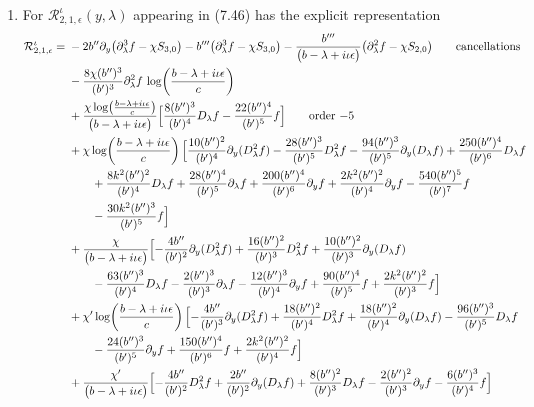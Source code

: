 \documentclass[reqno,11pt]{amsart}
\numberwithin{equation}{section}
\newcommand{\p}{\partial}
\newcommand{\D}{D_\lambda}
\numberwithin{equation}{section} %
\begin{document}
\begin{enumerate}
\item For $\mathcal{R}^\iota_{2,1,\epsilon}(y,\lambda)$ appearing in (7.46) has the explicit representation
\setlength{\jot}{3pt}
\begin{align}
\mathcal{R}^\iota_{2,1,\epsilon}={}&-2b'' \p_y\bigl(\p_\lambda^3f-\chi S_{3,0}\bigr)-b''' \bigl(\p_\lambda^3f-\chi S_{3,0}\bigr)-\frac{b''' }{\bigl(b -\lambda+i\iota\epsilon\bigr)}\bigl(\p_\lambda^2f-\chi S_{2,0}\bigr)\tag*{\text{cancellations}}\\
&-\frac{8\chi (b'' )^{3}}{(b' )^{3}}\p_\lambda^2f\,\log\!\left(\frac{b -\lambda+i\iota\epsilon}{c}\right)\notag\\
&+\frac{\chi\log\!\left(\frac{b -\lambda+i\iota\epsilon}{c}\right)}{\bigl(b -\lambda+i\iota\epsilon\bigr)}\Bigl[\frac{8 (b'' )^{3}}{(b' )^{4}} \D f- \frac{22 (b'' )^{4}}{(b' )^{5}} f\Bigr]\tag*{\text{order $-5$}}\\
&+\chi\log\!\left(\frac{b -\lambda+i\iota\epsilon}{c}\right)\Bigl[\frac{10 (b'' )^{2}}{(b' )^{4}} \p_y(\D^2 f)- \frac{28 (b'' )^{3}}{(b' )^{5}} \D^2 f- \frac{94 (b'' )^{3}}{(b' )^{5}} \p_y(\D f)+\frac{250 (b'' )^{4}}{(b' )^{6}} \D f\notag\\
&\qquad +\frac{8 k^2 (b'' )^{2}}{(b' )^{4}} \D f+\frac{28 (b'' )^{4}}{(b' )^{5}} \p_\lambda f+\frac{200 (b'' )^{4}}{(b' )^{6}} \p_y f+\frac{2 k^2 (b'' )^{2}}{(b' )^{4}} \p_y f- \frac{540 (b'' )^{5}}{(b' )^{7}} f\notag\\
&\qquad - \frac{30 k^2 (b'' )^{3}}{(b' )^{5}} f\Bigr]\notag\\
&+\frac{\chi}{\bigl(b -\lambda+i\iota\epsilon\bigr)}\Bigl[- \frac{4 b'' }{(b' )^{2}} \p_y(\D^2 f)+\frac{16 (b'' )^{2}}{(b' )^{3}} \D^2 f+\frac{10 (b'' )^{2}}{(b' )^{3}} \p_y(\D f)\notag\\
&\qquad - \frac{63 (b'' )^{3}}{(b' )^{4}} \D f- \frac{2 (b'' )^{3}}{(b' )^{3}} \p_\lambda f- \frac{12 (b'' )^{3}}{(b' )^{4}} \p_y f+\frac{90 (b'' )^{4}}{(b' )^{5}} f+\frac{2 k^2 (b'' )^{2}}{(b' )^{3}} f\Bigr]\notag\\
&+\chi'\log\!\left(\frac{b -\lambda+i\iota\epsilon}{c}\right)\Bigl[- \frac{4 b'' }{(b' )^{3}} \p_y(\D^2 f)+\frac{18 (b'' )^{2}}{(b' )^{4}} \D^2 f+\frac{18 (b'' )^{2}}{(b' )^{4}} \p_y(\D f)- \frac{96 (b'' )^{3}}{(b' )^{5}} \D f\notag\\
&\qquad - \frac{24 (b'' )^{3}}{(b' )^{5}} \p_y f+\frac{150 (b'' )^{4}}{(b' )^{6}} f+\frac{2 k^2 (b'' )^{2}}{(b' )^{4}} f\Bigr]\notag\\
&+\frac{\chi'}{\bigl(b -\lambda+i\iota\epsilon\bigr)}\Bigl[- \frac{4 b'' }{(b' )^{2}} \D^2 f+\frac{2 b'' }{(b' )^{2}} \p_y(\D f)+\frac{8 (b'' )^{2}}{(b' )^{3}} \D f- \frac{2 (b'' )^{2}}{(b' )^{3}} \p_y f- \frac{6 (b'' )^{3}}{(b' )^{4}} f\Bigr]\notag\\

\end{align}
\end{enumerate}
\end{document}
